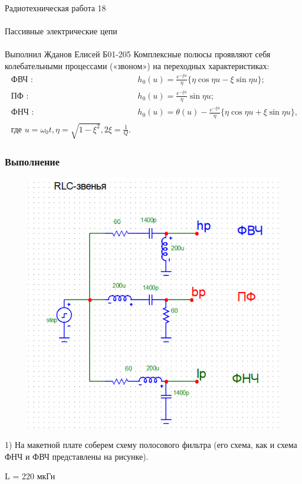 \documentclass{astroedu-lab}
\begin{document}
\begin{problem}{\huge Радиотехническая работа 18\\\\Пассивные электрические цепи\\\\Выполнил Жданов Елисей Б01-205}
Комплексные полюсы проявляют себя колебательными процессами («звоном») на переходных характеристиках:
$$
\begin{array}{cl}
\text { ФВЧ : } & h_0(u)=\frac{e^{-\xi u}}{\eta}\{\eta \cos \eta u-\xi \sin \eta u\} ; \\
\text { ПФ : } & h_0(u)=\frac{e^{-\xi u}}{\eta} \sin \eta u ; \\
\text { ФНЧ : } & h_0(u)=\theta(u)-\frac{e^{-\xi u}}{\eta}\{\eta \cos \eta u+\xi \sin \eta u\}, \\
\text { где } u=\omega_0 t, \eta=\sqrt{1-\xi^2}, 2 \xi=\frac{1}{Q} .
\end{array}
$$

\subsubsection{Выполнение}

\begin{figure}[!h]
	\centering
	\includegraphics[width=1\textwidth]{4_3.png}
	\label{fig:boiler}
\end{figure}

1) На макетной плате соберем схему полосового фильтра (его схема, как и схема ФНЧ и ФВЧ представлены на рисунке).

\begin{center}
	L = 220 мкГн
	

\end{center}
\end{problem}
\end{document}
